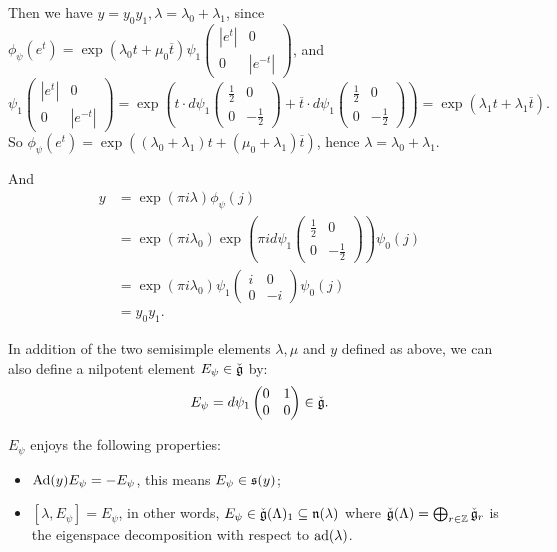 Then we have $y = y_0 y_1, \lambda = \lambda_0 + \lambda_1$, since $\phi_{\psi}(e^t) = \exp(\lambda_0 t + \mu_0 \overline{t})\psi_1\begin{pmatrix} |e^{t}| & 0 \\ 0 & |e^{-t}| \end{pmatrix}$, and
\[
\psi_1\begin{pmatrix} |e^{t}| & 0 \\ 0 & |e^{-t}| \end{pmatrix} = \exp\left( t \cdot d\psi_1 \begin{pmatrix}\frac{1}{2} & 0 \\ 0 & -\frac{1}{2} \end{pmatrix} + \overline{t} \cdot d\psi_1 \begin{pmatrix}\frac{1}{2} & 0 \\ 0 & -\frac{1}{2} \end{pmatrix} \right) = \exp(\lambda_1 t + \lambda_1 \overline{t}).
\]
So $\phi_{\psi}(e^t) = \exp((\lambda_0 + \lambda_1)t + (\mu_0 + \lambda_1)\overline{t})$, hence $\lambda = \lambda_0 + \lambda_1$.

And
\begin{align*}
  y
    &= \exp(\pi i \lambda)\phi_{\psi}(j) \\
    &= \exp(\pi i \lambda_0)
       \exp\left(\pi i d\psi_1
         \begin{pmatrix} \frac{1}{2} & 0 \\ 0 & -\frac{1}{2} \end{pmatrix}\right)
       \psi_0(j) \\
    &= \exp(\pi i \lambda_0)
       \psi_1\begin{pmatrix} i & 0 \\ 0 & -i \end{pmatrix}
       \psi_0(j) \\
    &= y_0y_1.
\end{align*}

In addition of the two semisimple elements $\lambda, \mu$ and $y$ defined as above, we can also define a nilpotent element $E_{\psi} \in \check{\mathfrak{g}}$ by:
\[E_{\psi} = d\psi_{1}\begin{pmatrix}0 & 1 \\ 0 & 0\end{pmatrix} \in \check{\mathfrak{g}}.\]

$E_{\psi}$ enjoys the following properties:
\begin{itemize}
  \item $\operatorname{Ad}(y) E_{\psi} = -E_{\psi}$, this means $E_{\psi} \in \mathfrak{s}(y)$;
  \item $[\lambda, E_{\psi}] =  E_{\psi}$, in other words, $E_{\psi} \in \check{\mathfrak{g}}(\Lambda)_{1} \subseteq \mathfrak{n}(\lambda)$ where $\check{\mathfrak{g}}(\Lambda) = \bigoplus_{r \in \mathbb{Z}} \check{\mathfrak{g}}_r$ is the eigenspace decomposition with respect to $\operatorname{ad}(\lambda)$.
\end{itemize}

